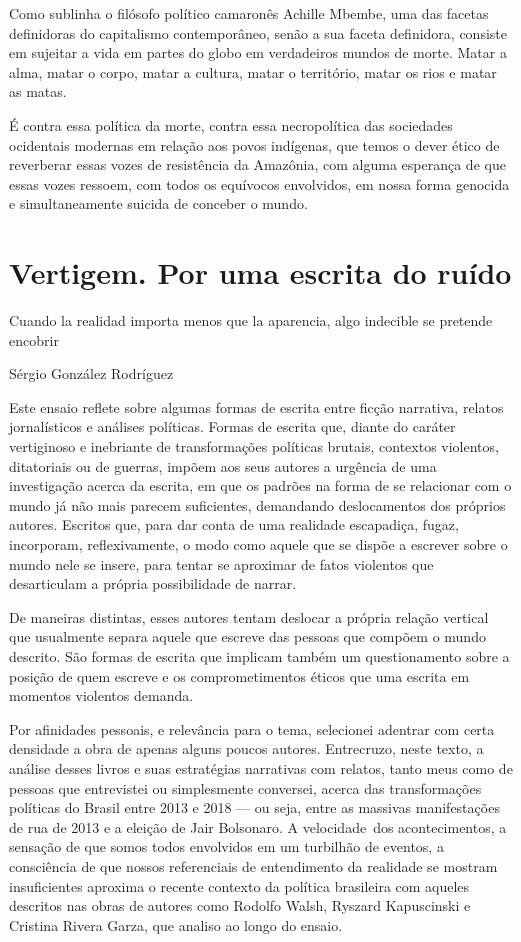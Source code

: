 Como sublinha o filósofo político camaronês Achille Mbembe, uma das
facetas definidoras do capitalismo contemporâneo, senão a sua faceta
definidora, consiste em sujeitar a vida em partes do globo em
verdadeiros mundos de morte. Matar a alma, matar o corpo, matar a
cultura, matar o território, matar os rios e matar as matas.

É contra
essa política da morte, contra essa necropolítica das sociedades
ocidentais modernas em relação aos povos indígenas, que temos o dever
ético de reverberar essas vozes de resistência da Amazônia, com alguma esperança de que essas vozes
ressoem, com todos os equívocos envolvidos, em nossa forma genocida e
simultaneamente suicida de conceber o mundo.

\chapter{Vertigem. Por uma escrita do ruído}

\epigraph{Cuando la realidad importa menos que la aparencia, algo indecible
se pretende encobrir}{Sérgio González Rodríguez}

Este ensaio reflete sobre algumas formas de escrita entre ficção
narrativa, relatos jornalísticos e análises políticas. Formas de escrita
que, diante do caráter vertiginoso e inebriante de transformações
políticas brutais, contextos violentos, ditatoriais ou de guerras, impõem
aos seus autores a urgência de uma investigação acerca da escrita, em
que os padrões na forma de se relacionar com o mundo já não mais parecem
suficientes, demandando deslocamentos dos próprios autores. Escritos que,
para dar conta de uma realidade escapadiça, fugaz, incorporam,
reflexivamente, o modo como aquele que se dispõe a escrever sobre o
mundo nele se insere, para tentar se aproximar de fatos violentos que
desarticulam a própria possibilidade de narrar.

De maneiras distintas,
esses autores tentam deslocar a própria relação vertical que usualmente
separa aquele que escreve das pessoas que compõem o mundo descrito. São formas de escrita que implicam também um questionamento sobre a posição de quem escreve e os comprometimentos éticos que uma escrita em momentos violentos demanda.

Por afinidades pessoais, e relevância para o tema, selecionei adentrar com certa densidade a obra de apenas alguns poucos autores. Entrecruzo, neste texto, a análise desses livros e suas estratégias narrativas com relatos, tanto meus como de pessoas que entrevistei ou simplesmente conversei, acerca das transformações políticas do Brasil entre 2013 e 2018 --- ou seja, entre as massivas manifestações de rua de 2013 e a eleição de Jair Bolsonaro. A velocidade dos acontecimentos, a sensação de que somos todos envolvidos em um turbilhão de eventos, a consciência de que nossos referenciais de entendimento da realidade se mostram insuficientes aproxima o recente contexto da política brasileira com aqueles descritos nas obras de autores como Rodolfo Walsh, Ryszard Kapuscinski e Cristina Rivera Garza, que analiso ao longo do ensaio.

